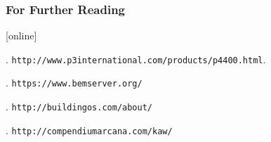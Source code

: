 \documentclass{beamer}
\begin{document}
\begin{frame}[allowframebreaks]
  \frametitle<presentation>{For Further Reading}
    
  \begin{thebibliography}{10}
    
  [online]

    .
    \newblock \texttt{http://www.p3international.com/products/p4400.html}.
    
  	.
  	\newblock \texttt{https://www.bemserver.org/}
  	
  	.
  	\newblock \texttt{http://buildingos.com/about/}

  	.
  	\newblock \texttt{http://compendiumarcana.com/kaw/}

  \end{thebibliography}
  
\end{frame}
\end{document}
